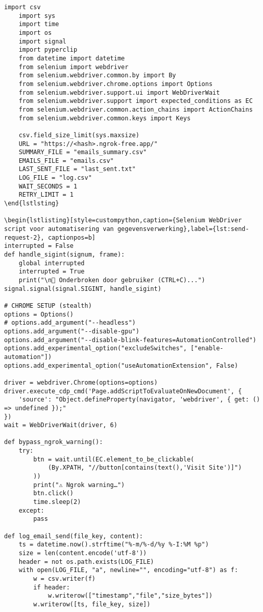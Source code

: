 \begin{lstlisting}[style=custompython,caption={Selenium WebDriver script voor automatisering van gegevensverwerking variabelen},label={lst:send-request}, captionpos=b]
    import csv
    import sys
    import time
    import os
    import signal
    import pyperclip
    from datetime import datetime
    from selenium import webdriver
    from selenium.webdriver.common.by import By
    from selenium.webdriver.chrome.options import Options
    from selenium.webdriver.support.ui import WebDriverWait
    from selenium.webdriver.support import expected_conditions as EC
    from selenium.webdriver.common.action_chains import ActionChains
    from selenium.webdriver.common.keys import Keys

    csv.field_size_limit(sys.maxsize)
    URL = "https://<hash>.ngrok-free.app/"
    SUMMARY_FILE = "emails_summary.csv"
    EMAILS_FILE = "emails.csv"
    LAST_SENT_FILE = "last_sent.txt"
    LOG_FILE = "log.csv"
    WAIT_SECONDS = 1
    RETRY_LIMIT = 1
\end{lstlsting}

\begin{lstlisting}[style=custompython,caption={Selenium WebDriver script voor automatisering van gegevensverwerking},label={lst:send-request-2}, captionpos=b]
interrupted = False
def handle_sigint(signum, frame):
    global interrupted
    interrupted = True
    print("\n🛑 Onderbroken door gebruiker (CTRL+C)...")
signal.signal(signal.SIGINT, handle_sigint)

# CHROME SETUP (stealth)
options = Options()
# options.add_argument("--headless")
options.add_argument("--disable-gpu")
options.add_argument("--disable-blink-features=AutomationControlled")
options.add_experimental_option("excludeSwitches", ["enable-automation"])
options.add_experimental_option("useAutomationExtension", False)

driver = webdriver.Chrome(options=options)
driver.execute_cdp_cmd('Page.addScriptToEvaluateOnNewDocument', {
    'source': "Object.defineProperty(navigator, 'webdriver', { get: () => undefined });"
})
wait = WebDriverWait(driver, 6)

def bypass_ngrok_warning():
    try:
        btn = wait.until(EC.element_to_be_clickable(
            (By.XPATH, "//button[contains(text(),'Visit Site')]")
        ))
        print("⚠️ Ngrok warning…")
        btn.click()
        time.sleep(2)
    except:
        pass

def log_email_send(file_key, content):
    ts = datetime.now().strftime("%-m/%-d/%y %-I:%M %p")
    size = len(content.encode('utf-8'))
    header = not os.path.exists(LOG_FILE)
    with open(LOG_FILE, "a", newline="", encoding="utf-8") as f:
        w = csv.writer(f)
        if header:
            w.writerow(["timestamp","file","size_bytes"])
        w.writerow([ts, file_key, size])


\end{lstlisting}
